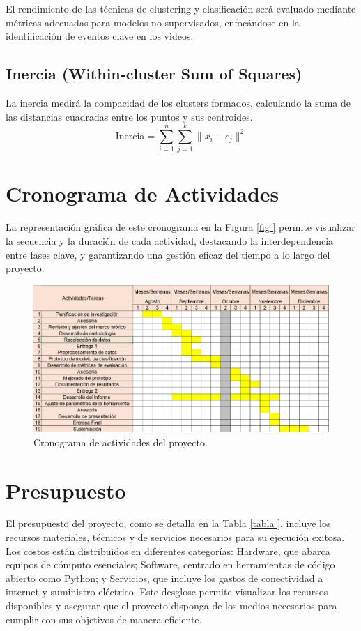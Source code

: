 El rendimiento de las técnicas de clustering y clasificación será evaluado mediante métricas adecuadas para modelos no supervisados, enfocándose en la identificación de eventos clave en los videos.


\subsection*{Inercia (Within-cluster Sum of Squares)}
La inercia medirá la compacidad de los clusters formados, calculando la suma de las distancias cuadradas entre los puntos y sus centroides.
\begin{equation}
    \text{Inercia} = \sum_{i=1}^{n} \sum_{j=1}^{k} \| x_i - c_j \|^2
\end{equation}


\section{Cronograma de Actividades}

La representación gráfica de este cronograma en la Figura \ref{fig
} permite visualizar la secuencia y la duración de cada actividad, destacando la interdependencia entre fases clave, y garantizando una gestión eficaz del tiempo a lo largo del proyecto.

\begin{figure}[H]
	\centering
	\includegraphics[width=1\textwidth]{3/figures/Gantt.png}
	\caption{Cronograma de actividades del proyecto.}
	\label{fig:cronograma_actividades}
\end{figure}


\section{Presupuesto}
El presupuesto del proyecto, como se detalla en la Tabla \ref{tabla
}, incluye los recursos materiales, técnicos y de servicios necesarios para su ejecución exitosa. Los costos están distribuidos en diferentes categorías: Hardware, que abarca equipos de cómputo esenciales; Software, centrado en herramientas de código abierto como Python; y Servicios, que incluye los gastos de conectividad a internet y suministro eléctrico. Este desglose permite visualizar los recursos disponibles y asegurar que el proyecto disponga de los medios necesarios para cumplir con sus objetivos de manera eficiente.

